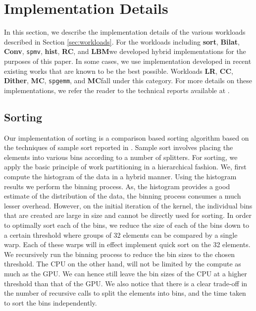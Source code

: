 \documentclass[11pt]{article}
\newcommand{\sgemm} {{\tt spgemm}}
\newcommand{\spmv} {{\tt spmv}}
\newcommand{\bilat} {{\bf Bilat}}
\newcommand{\conv} {{\bf Conv}}
\newcommand{\hist} {{\bf hist}}
\newcommand{\sort} {{\bf sort}}
\newcommand{\LR} {{\bf LR}}
\newcommand{\CC} {{\bf CC}}
\newcommand{\RC} {{\bf RC}}
\newcommand{\MC} {{\bf MC}}
\newcommand{\Dither} {{\bf Dither}}
\newcommand{\LBM} {{\bf LBM}}
\begin{document}
\section{Implementation Details}
\label{sec:impl} 
In this section, we describe the implementation details of the various
workloads described in Section \ref{sec:workloads}. For the workloads
including \sort, \bilat, \conv, \spmv, \hist,
\RC, and \LBM we developed hybrid implementations for the  purposes of
this paper. In some cases, we use implementation developed in recent existing
works that are known to be the
best possible. Workloads \LR, \CC, \Dither, \MC, \sgemm, and \MC fall under this
category.   For more details on these implementations, we refer the reader
to the technical reports available at \cite{url}.


\subsection{Sorting}

Our implementation of sorting is a comparison based sorting
algorithm based on the techniques of sample sort reported in
\cite{sanders10}. Sample sort involves placing the elements into various
bins according to a number of splitters.
For sorting, we apply the basic principle of work partitioning
in a hierarchical fashion. We, first compute the histogram of
the data in a hybrid manner. Using the histogram results we
perform the binning process. As, the histogram provides a good
estimate of the distribution of the data, the binning process
consumes a much lesser overhead. However, on the initial iteration
of the kernel, the individual bins that are created are large in size
and cannot be directly used for sorting. 
In order to optimally sort each of the bins, we  reduce the size of
each of the bins down to a certain threshold where groups of 32
elements can be compared by a single warp. Each of these warps will in effect
implement quick sort on the 32 elements. We recursively run the binning
process to reduce the bin sizes to the chosen threshold.  The CPU on
the other hand,
will not be limited by the compute as much as the GPU. We can hence
still leave the bin
sizes of the CPU at a higher threshold than that of the GPU. 
We also notice that there is a clear
trade-off in the number of recursive calls to split the elements
into bins, and the time taken to sort the bins independently.
\end{document}
